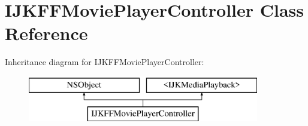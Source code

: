 \hypertarget{interface_i_j_k_f_f_movie_player_controller}{}\section{I\+J\+K\+F\+F\+Movie\+Player\+Controller Class Reference}
\label{interface_i_j_k_f_f_movie_player_controller}
Inheritance diagram for I\+J\+K\+F\+F\+Movie\+Player\+Controller\+:\begin{figure}[H]
\begin{center}
\leavevmode
\includegraphics[height=2.000000cm]{interface_i_j_k_f_f_movie_player_controller}
\end{center}
\end{figure}
